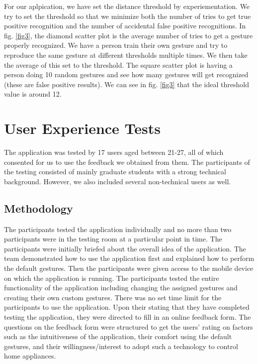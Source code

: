 \documentclass[journal]{IEEEtran}
\begin{document}
	For our aplpication, we have set the distance threshold by experiementation. We try to set the threshold so that we minimize both the number of tries to get true positive recognition and the number of accidental false positive recognitions. In fig. \ref{fig3}, the diamond scatter plot is the average number of tries to get a gesture properly recognized. We have a person train their own gesture and try to reproduce the same gesture at different thresholds multiple times. We then take the average of this set to the threshold. The square scatter plot is having a person doing 10 random gestures and see how many gestures will get recognized (these are false positive results). We can see in fig. \ref{fig3} that the ideal threshold value is around 12.  

 


\section{User Experience Tests}

The application was tested by 17 users aged between 21-27, all of which consented for us to use the feedback we obtained from them. The participants of the testing consisted of mainly graduate students with a strong technical background. However, we also included several non-technical users as well.

\subsection{Methodology}

The participants tested the application individually and no more than two participants were in the testing room at a particular point in time. The participants were initially briefed about the overall idea of the application. The team demonstrated how to use the application first and explained how to perform the default gestures. Then the participants were given access to the mobile device on which the application is running. The participants tested the entire functionality of the application including changing the assigned gestures and creating their own custom gestures. There was no set time limit for the participants to use the application. Upon their stating that they have completed testing the application, they were directed to fill in an online feedback form. The questions on the feedback form were structured to get the users' rating on factors such as the intuitiveness of the application, their comfort using the default gestures, and their willingness/interest to adopt such a technology to control home appliances.
\end{document}
